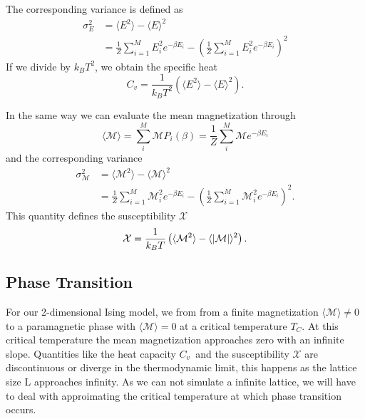 \documentclass[%
reprint,
nofootinbib,
amsmath,amssymb,
aps,
]{revtex4-1}
\begin{document}
The corresponding variance is defined as 
\begin{equation}
	\begin{split}
\sigma_E^2 &= \langle E^2 \rangle -\langle E\rangle^2 \\
&= \frac{1}{Z}\sum_{i=1}^ME_i^2e^{-\beta E_i} - \left(\frac{1}{Z}\sum_{i=1}^ME_i^2e^{-\beta E_i}\right)^2
	\end{split}
\end{equation}
If we divide by $k_BT^2$, we obtain the specific heat 
\begin{equation}\label{eq:cv}
	C_v = \frac{1}{k_BT^2}\left(\langle E^2 \rangle -\langle E\rangle^2\right).
\end{equation}

In the same way we can evaluate the mean magnetization through 
\begin{equation}\label{eq:M}
	\langle\mathcal{M}\rangle = \sum_i^M\mathcal{M}P_i(\beta) = \frac{1}{Z}\sum_i^M\mathcal{M}e^{-\beta E_i}
\end{equation}
and the corresponding variance 
\begin{equation}
\begin{split} 
		\sigma_\mathcal{M}^2			&=\langle \mathcal{M}^2 \rangle -\langle \mathcal{M}\rangle^2 \\
			&= \frac{1}{Z}\sum_{i=1}^M\mathcal{M}_i^2e^{-\beta E_i} - \left(\frac{1}{Z}\sum_{i=1}^M\mathcal{M}_i^2e^{-\beta E_i}\right)^2.
		\end{split} 
\end{equation}
This quantity defines the susceptibility $\mathcal{X}$
\begin{equation}\label{eq:x}
	\mathcal{X} = \frac{1}{k_BT}\left(\langle \mathcal{M}^2 \rangle -\langle \abs{\mathcal{M}}\rangle^2\right).
\end{equation}
\subsection{Phase Transition} %
For our 2-dimensional Ising model, we from from a finite magnetization $\langle \mathcal{M} \rangle \neq 0$ to a paramagnetic phase with $\langle \mathcal{M} \rangle = 0$ at a critical temperature $T_C$. At this critical temperature the mean magnetization approaches zero with an infinite slope. Quantities like the heat capacity $C_v$ and the susceptibility $\mathcal{X}$ are discontinuous or diverge in the thermodynamic limit\cite{morten}, this happens as the lattice size L approaches infinity. As we can not simulate a infinite lattice, we will have to deal with approimating the critical temperature at which phase transition occurs. 
\end{document}

